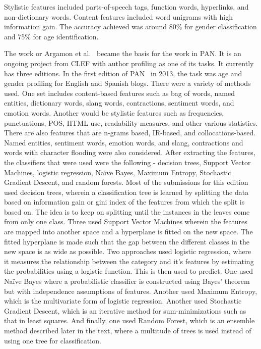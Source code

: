 \documentclass[a4paper]{llncs}
\begin{document}
Stylistic features included parts-of-speech tags, function words, hyperlinks, and non-dictionary words. Content features included word unigrams with high information gain. The accuracy achieved was around 80\% for gender classification and 75\% for age identification.  

The work or Argamon et al.~\cite{argamon2009automatically} became the basis for the work in PAN. It is an ongoing project from CLEF with author profiling as one of its tasks. It currently has three editions. In the first edition of PAN~\cite{rangel2013overview} in 2013, the task  was age and gender profiling for English and Spanish blogs. There were a variety of methods used. One set includes content-based features such as bag of words, named entities, dictionary words, slang words, contractions, sentiment words, and emotion words. Another would be stylistic features such as frequencies, punctuations, POS, HTML use, readability measures, and other various statistics. There are also features that are n-grams based, IR-based, and collocations-based. Named entities, sentiment words, emotion words, and slang, contractions and words with character flooding were also considered. After extracting the features, the classifiers that were used were the following - decision trees, Support Vector Machines, logistic regression, Naïve Bayes, Maximum Entropy, Stochastic Gradient Descent, and random forests. Most of the submissions for this edition used decision trees, wherein a classification tree is learned by splitting the data based on information gain or gini index of the features from which the split is based on. The idea is to keep on splitting until the  instances in the leaves come from only one class. Three used Support Vector Machines wherein the features are mapped into another space and a hyperplane is fitted on the new space. The fitted hyperplane is made such that the gap between the different classes in the new space is as wide as possible. Two approaches used logistic regression, where it measures the relationship between the category and it's features by estimating the probabilities using a logistic function. This is then used to predict. One used Naïve Bayes where a probabilistic classifier is constructed using Bayes' theorem but with independence assumptions of features. Another used Maximum Entropy, which is the multivariate form of logistic regression. Another used Stochastic Gradient Descent, which is an iterative method for sum-minimizations such as that in least squares. And finally, one used Random Forest, which is an ensemble method described later in the text, where a multitude of trees is used instead of using one tree for classification. 
\end{document}
